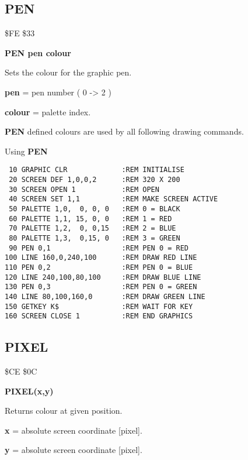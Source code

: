 \subsection{PEN}
\begin{description}[leftmargin=2cm,style=nextline]
\item [Token:] \$FE \$33
\item [Format:] {\bf PEN pen colour}
\item [Usage:]  Sets the colour for the graphic pen.

                {\bf pen} = pen number ( 0 -> 2 )

                {\bf colour} = palette index.

\item [Remarks:] {\bf PEN} defined colours are used by all
                 following drawing commands.

\item [Example:] Using {\bf PEN}

\begin{tcolorbox}[colback=black,coltext=white]
\verbatimfont{\codefont}
\begin{verbatim}
 10 GRAPHIC CLR             :REM INITIALISE
 20 SCREEN DEF 1,0,0,2      :REM 320 X 200
 30 SCREEN OPEN 1           :REM OPEN
 40 SCREEN SET 1,1          :REM MAKE SCREEN ACTIVE
 50 PALETTE 1,0,  0, 0, 0   :REM 0 = BLACK
 60 PALETTE 1,1, 15, 0, 0   :REM 1 = RED
 70 PALETTE 1,2,  0, 0,15   :REM 2 = BLUE
 80 PALETTE 1,3,  0,15, 0   :REM 3 = GREEN
 90 PEN 0,1                 :REM PEN 0 = RED
100 LINE 160,0,240,100      :REM DRAW RED LINE
110 PEN 0,2                 :REM PEN 0 = BLUE
120 LINE 240,100,80,100     :REM DRAW BLUE LINE
130 PEN 0,3                 :REM PEN 0 = GREEN
140 LINE 80,100,160,0       :REM DRAW GREEN LINE
150 GETKEY K$               :REM WAIT FOR KEY
160 SCREEN CLOSE 1          :REM END GRAPHICS
\end{verbatim}
\end{tcolorbox}
\end{description}




\newpage
\subsection{PIXEL}
\begin{description}[leftmargin=2cm,style=nextline]
\item [Token:] \$CE \$0C
\item [Format:] {\bf PIXEL(x,y)}
\item [Usage:]  Returns colour at given position.

               {\bf x} = absolute screen coordinate [pixel].

               {\bf y} = absolute screen coordinate [pixel].
\end{description}


